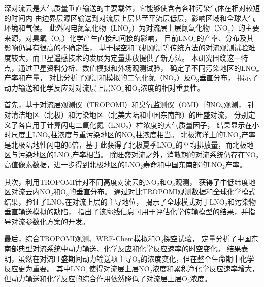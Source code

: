 
\abstract
{
深对流云是大气质量垂直输送的主要载体，它能够使含有各种污染气体在相对较短的时间内
由边界层源区输送到对流层上层甚至平流层低层，影响区域和全球大气环境和气候。
此外闪电氮氧化物（LNO$_x$）为对流层上层氮氧化物（NO$_x$）的主要来源，对臭氧（O$_3$）化学产生直接和间接的影响，
目前LNO$_x$的产率、分布及其影响仍具有很高的不确定性，
基于探空和飞机观测等传统方法的对流观测试验难度较大，而卫星遥感技术的发展为定量排放提供了新方法。
本研究围绕这一特点，通过卫星资料分析、数值模拟和外场观测试验，
确定了不同污染地区的LNO$_x$产率和产量，
对比分析了观测和模拟的二氧化氮（NO$_2$）及O$_3$垂直分布，
揭示了动力输送和化学反应对对流层上层NO$_x$和O$_3$浓度的相对重要性。

首先，基于对流层观测仪（TROPOMI）和臭氧监测仪（OMI）的NO$_2$观测，
针对清洁地区（北极）和污染地区（北美大陆和中国东南部）的旺盛对流，
分别定义了各自用于计算闪电二氧化氮（LNO$_2$）柱浓度的大气质量因子，
结果显示在小时尺度上LNO$_2$柱浓度与重污染地区的NO$_2$柱浓度相当。
北极海洋上的LNO$_2$产率是北极陆地性闪电的6倍，基于此获得了北极夏季LNO$_x$的平均排放量，而北极地区与污染地区的LNO$_2$产率相当。
除旺盛对流之外，消散期的对流系统仍存在NO$_2$高值像素数据，进一步得到北极地区的LNO$_2$寿命和中国东南部的LNO$_2$产率。

其次，利用TROPOMI针对不同高度对流云的NO$_2$和O$_3$观测，
获得了中低纬度地区对流云内NO$_2$和O$_3$的垂直分布。
通过对比TROPOMI观测数据和全球化学模式结果，验证了LNO$_2$在对流上层的主导地位，
揭示了全球模式对于LNO$_2$和污染物垂直输送模拟的缺陷，
指出了该廓线信息可用于评估化学传输模型的结果，并指导对流参数化方案的开发。

最后，综合TROPOMI观测、WRF-Chem模拟和O$_3$探空试验，
定量分析了中国东南部典型对流系统中动力输送、化学反应和化学反应速率的时空变化。
结果表明，虽然在对流旺盛期间动力输送项主导O$_3$的浓度变化，但在整个生命期中化学反应更为重要。
其中LNO$_x$使得对流层上层NO$_2$浓度和累积净化学反应速率增大，但动力输送和化学反应的综合作用依然降低了对流层上层O$_3$浓度。
}
{

}
